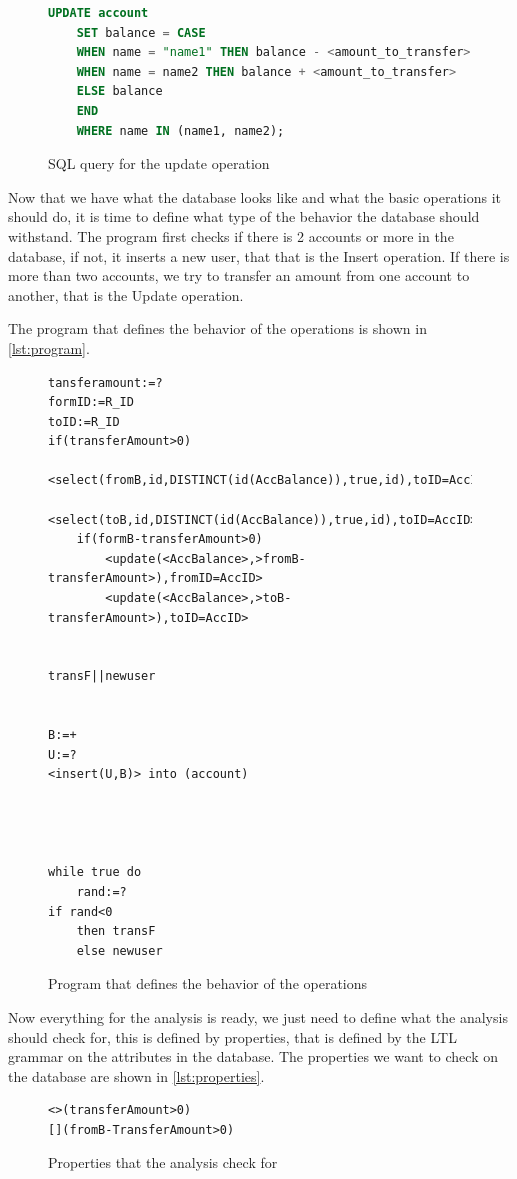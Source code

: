 \begin{figure}[htb!]
\begin{lstlisting}[language=SQL]
    UPDATE account
    SET balance = CASE
    WHEN name = "name1" THEN balance - <amount_to_transfer>
    WHEN name = name2 THEN balance + <amount_to_transfer>
    ELSE balance
    END
    WHERE name IN (name1, name2);
\end{lstlisting}
\label{lst:sql-queries2}
\caption{SQL query for the update operation}
\end{figure}
Now that we have what the database looks like and what the basic operations it should do, it is time to define what type of the behavior the database should withstand.
The program first checks if there is 2 accounts or more in the database, if not, it inserts a new user, that that is the Insert operation.
If there is more than two accounts, we try to transfer an amount from one account to another, that is the Update operation.

The program that defines the behavior of the operations is shown in \autoref{lst:program}.

\begin{figure}[htb!]
\begin{lstlisting}
tansferamount:=?
formID:=R_ID
toID:=R_ID
if(transferAmount>0)
    <select(fromB,id,DISTINCT(id(AccBalance)),true,id),toID=AccID>
    <select(toB,id,DISTINCT(id(AccBalance)),true,id),toID=AccID>
    if(formB-transferAmount>0)
        <update(<AccBalance>,>fromB-transferAmount>),fromID=AccID>
        <update(<AccBalance>,>toB-transferAmount>),toID=AccID>


transF||newuser


B:=+
U:=?
<insert(U,B)> into (account)




while true do
    rand:=?
if rand<0
    then transF
    else newuser
\end{lstlisting}
\label{lst:program}
\caption{Program that defines the behavior of the operations}
\end{figure}

Now everything for the analysis is ready, we just need to define what the analysis should check for, this is defined by properties, that is defined by the LTL grammar on the attributes in the database.
The properties we want to check on the database are shown in \autoref{lst:properties}.
\begin{figure}[htb!]
\begin{lstlisting}
<>(transferAmount>0)
[](fromB-TransferAmount>0)
    \end{lstlisting}
\label{lst:properties}
\caption{Properties that the analysis check for}
\end{figure}

